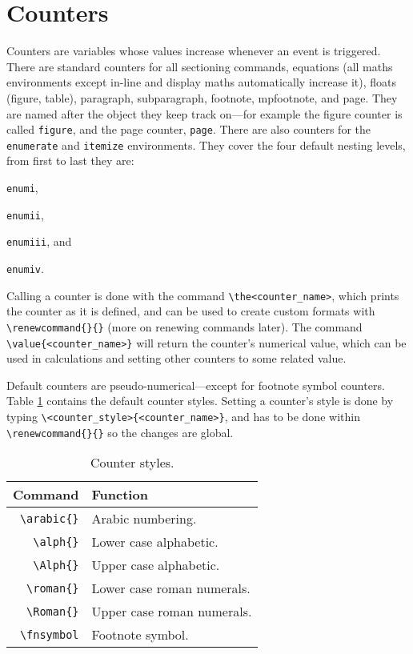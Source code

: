 \section{Counters}\label{s:counters}
%
Counters are variables whose values increase whenever an event is triggered. There are standard counters for all sectioning commands, equations (all maths environments except in-line and display maths automatically increase it), floats (figure, table), paragraph, subparagraph, footnote, mpfootnote, and page. They are named after the object they keep track on---for example the figure counter is called \verb|figure|, and the page counter, \verb|page|. There are also counters for the \verb|enumerate| and \verb|itemize| environments. They cover the four default nesting levels, from first to last they are: 
\begin{inparaenum}[\itshape 1\upshape)]
    \item \verb|enumi|, 
    \item \verb|enumii|, 
    \item \verb|enumiii|, and 
    \item \verb|enumiv|.
\end{inparaenum}

Calling a counter is done with the command \verb|\the<counter_name>|, which prints the counter as it is defined, and can be used to create custom formats with \verb|\renewcommand{}{}| (more on renewing commands later). The command \verb|\value{<counter_name>}| will return the counter's numerical value, which can be used in calculations and setting other counters to some related value.

Default counters are pseudo-numerical---except for footnote symbol counters. Table \ref{t:countsymb} contains the default counter styles. Setting a counter's style is done by typing \verb|\<counter_style>{<counter_name>}|, and has to be done within \verb|\renewcommand{}{}| so the changes are global.
\begin{table}[!htbp]
    \centering
    \caption{Counter styles.}
    \label{t:countsymb}
    \begin{tabular}{rl}
        \toprule
        Command & Function \\
        \midrule
        \verb|\arabic{}| & Arabic numbering. \\
        \verb|\alph{}| & Lower case alphabetic. \\
        \verb|\Alph{}| & Upper case alphabetic. \\
        \verb|\roman{}| & Lower case roman numerals. \\
        \verb|\Roman{}| & Upper case roman numerals. \\
        \verb|\fnsymbol| & Footnote symbol. \\
        \bottomrule
    \end{tabular}
\end{table}

